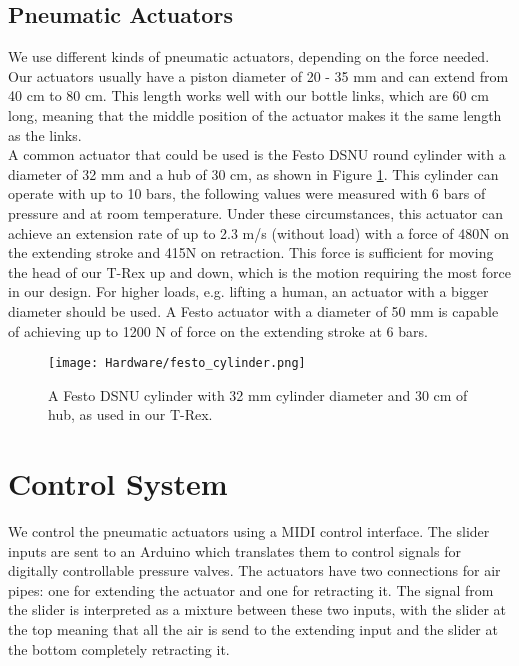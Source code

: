 \subsection{Pneumatic Actuators}
We use different kinds of pneumatic actuators, depending on the force needed. Our actuators usually have a piston diameter of 20 - 35 mm and can extend from 40 cm to 80 cm. This length works well with our bottle links, which are 60 cm long, meaning that the middle position of the actuator makes it the same length as the links.\\
A common actuator that could be used is the Festo DSNU round cylinder with a diameter of 32 mm and a hub of 30 cm, as shown in Figure \ref{fig:festo_cylinder}. This cylinder can operate with up to 10 bars, the following values were measured with 6 bars of pressure and at room temperature. Under these circumstances, this actuator can achieve an extension rate of up to 2.3 m/s (without load) with a force of 480N on the extending stroke and 415N on retraction. This force is sufficient for moving the head of our T-Rex up and down, which is the motion requiring the most force in our design. For higher loads, e.g. lifting a human, an actuator with a bigger diameter should be used. A Festo actuator with a diameter of 50 mm is capable of achieving up to 1200 N of force on the extending stroke at 6 bars.
\begin{figure}[h!]
    \texttt{[image: Hardware/festo\_cylinder.png]}
    \centering
    \caption{A Festo DSNU cylinder with 32 mm cylinder diameter and 30 cm of hub, as used in our T-Rex.}
    \label{fig:festo_cylinder}
\end{figure}

\section{Control System}
We control the pneumatic actuators using a MIDI control interface. The slider inputs are sent to an Arduino which translates them to control signals for digitally controllable pressure valves. The actuators have two connections for air pipes: one for extending the actuator and one for retracting it. The signal from the slider is interpreted as a mixture between these two inputs, with the slider at the top meaning that all the air is send to the extending input and the slider at the bottom completely retracting it.

